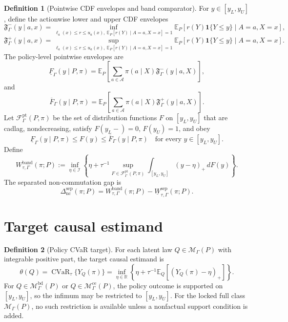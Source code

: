 \documentclass[11pt]{article}
\newcommand{\E}{\mathbb{E}}
\newcommand{\one}{\mathbf{1}}
\newcommand{\calF}{\mathcal{F}}
\newcommand{\R}{\mathbb{R}}
\theoremstyle{definition}
\newtheorem{definition}{Definition}
\theoremstyle{plain}
\theoremstyle{remark}
\begin{document}
\begin{definition}[Pointwise CDF envelopes and band comparator]\label{def:band}
For \(y\in[y_L,y_U]\), define the actionwise lower and upper CDF envelopes
\[
\mathfrak F_{\Gamma}^{-}(y\mid a,x)
=
\inf_{\ell_a(x)\le r\le u_a(x),\ \E_P[r(Y)\mid A=a,X=x]=1}
\E_P[r(Y)\one\{Y\le y\}\mid A=a,X=x],
\]
\[
\mathfrak F_{\Gamma}^{+}(y\mid a,x)
=
\sup_{\ell_a(x)\le r\le u_a(x),\ \E_P[r(Y)\mid A=a,X=x]=1}
\E_P[r(Y)\one\{Y\le y\}\mid A=a,X=x].
\]
The policy-level pointwise envelopes are
\[
\underline F_{\Gamma}(y\mid P,\pi)
=
\E_P\left[
\sum_{a\in\mathcal A}\pi(a\mid X)
\mathfrak F_{\Gamma}^{-}(y\mid a,X)
\right],
\]
and
\[
\overline F_{\Gamma}(y\mid P,\pi)
=
\E_P\left[
\sum_{a\in\mathcal A}\pi(a\mid X)
\mathfrak F_{\Gamma}^{+}(y\mid a,X)
\right].
\]
Let \(\calF_{\Gamma}^{\mathrm{pt}}(P,\pi)\) be the set of distribution
functions \(F\) on \([y_L,y_U]\) that are cadlag, nondecreasing, satisfy
\(F(y_L-)=0\), \(F(y_U)=1\), and obey
\[
\underline F_{\Gamma}(y\mid P,\pi)\le F(y)\le
\overline F_{\Gamma}(y\mid P,\pi)
\quad\text{for every }y\in[y_L,y_U].
\]
Define
\[
W_{\tau,\Gamma}^{\mathrm{band}}(\pi;P)
:=
\inf_{\eta\in\mathcal I}
\left\{
\eta+\tau^{-1}\sup_{F\in\calF_{\Gamma}^{\mathrm{pt}}(P,\pi)}
\int_{[y_L,y_U]} (y-\eta)_+\,dF(y)
\right\}.
\]
The separated non-commutation gap is
\[
\Delta_{\mathrm{nc}}^{\mathrm{sep}}(\pi;P)
=
W_{\tau,\Gamma}^{\mathrm{band}}(\pi;P)
-
\underline W_{\tau,\Gamma}^{\mathrm{sep}}(\pi;P).
\]
\end{definition}

\section{Target causal estimand}
\begin{definition}[Policy CVaR target]
For each latent law \(Q\in\mathcal M_\Gamma(P)\) with integrable positive part,
the target causal estimand is
\[
\theta(Q)=\operatorname{CVaR}_{\tau}\{Y_Q(\pi)\}
=
\inf_{\eta\in\R}
\left\{
\eta+\tau^{-1}\E_Q[(Y_Q(\pi)-\eta)_+]
\right\}.
\]
For \(Q\in\mathcal M_\Gamma^{\mathrm{bd}}(P)\) or
\(Q\in\mathcal M_\Gamma^{\mathrm{ce}}(P)\), the policy outcome is supported on
\([y_L,y_U]\), so the infimum may be restricted to \([y_L,y_U]\).  For the
locked full class \(\mathcal M_\Gamma(P)\), no such restriction is available
unless a nonfactual support condition is added.
\end{definition}
\end{document}
